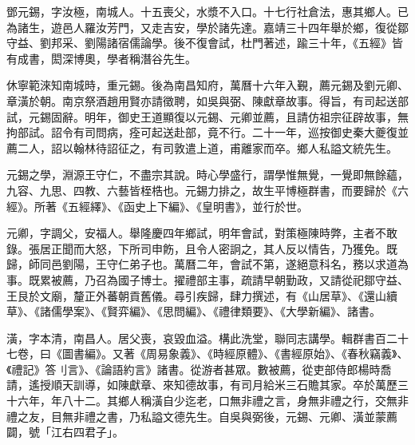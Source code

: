 \begin{pinyinscope}
鄧元錫，字汝極，南城人。十五喪父，水漿不入口。十七行社倉法，惠其鄉人。已為諸生，遊邑人羅汝芳門，又走吉安，學於諸先達。嘉靖三十四年舉於鄉，復從鄒守益、劉邦采、劉陽諸宿儒論學。後不復會試，杜門著述，踰三十年，《五經》皆有成書，閎深博奧，學者稱潛谷先生。

休寧範淶知南城時，重元錫。後為南昌知府，萬曆十六年入覲，薦元錫及劉元卿、章潢於朝。南京祭酒趙用賢亦請徵聘，如吳與弼、陳獻章故事。得旨，有司起送部試，元錫固辭。明年，御史王道顯復以元錫、元卿並薦，且請仿祖宗征辟故事，無拘部試。詔令有司問病，痊可起送赴部，竟不行。二十一年，巡按御史秦大夔復並薦二人，詔以翰林待詔征之，有司敦遣上道，甫離家而卒。鄉人私謚文統先生。

元錫之學，淵源王守仁，不盡宗其說。時心學盛行，謂學惟無覺，一覺即無餘蘊，九容、九思、四教、六藝皆桎梏也。元錫力排之，故生平博極群書，而要歸於《六經》。所著《五經繹》、《函史上下編》、《皇明書》，並行於世。

元卿，字調父，安福人。舉隆慶四年鄉試，明年會試，對策極陳時弊，主者不敢錄。張居正聞而大怒，下所司申飭，且令人密詗之，其人反以情告，乃獲免。既歸，師同邑劉陽，王守仁弟子也。萬曆二年，會試不第，遂絕意科名，務以求道為事。既累被薦，乃召為國子博士。擢禮部主事，疏請早朝勤政，又請從祀鄒守益、王艮於文廟，釐正外蕃朝貢舊儀。尋引疾歸，肆力撰述，有《山居草》、《還山續草》、《諸儒學案》、《賢弈編》、《思問編》、《禮律類要》、《大學新編》、諸書。

潢，字本清，南昌人。居父喪，哀毀血溢。構此洗堂，聯同志講學。輯群書百二十七卷，曰《圖書編》。又著《周易象義》、《時經原體》、《書經原始》、《春秋竊義》、《禮記》答刂言》、《論語約言》諸書。從游者甚眾。數被薦，從吏部侍郎楊時喬請，遙授順天訓導，如陳獻章、來知德故事，有司月給米三石贍其家。卒於萬歷三十六年，年八十二。其鄉人稱潢自少迄老，口無非禮之言，身無非禮之行，交無非禮之友，目無非禮之書，乃私謚文德先生。自吳與弼後，元錫、元卿、潢並蒙薦闢，號「江右四君子」。


\end{pinyinscope}